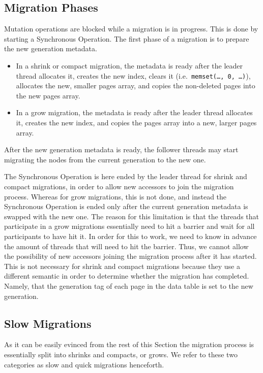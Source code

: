 \subsection{Migration Phases}\label{subsec:migration-phases}


Mutation operations are blocked while a migration is in progress.
This is done by starting a Synchronous Operation.
The first phase of a migration is to prepare the new generation metadata.
\begin{itemize}
	\item In a shrink or compact migration, the metadata is ready after the leader thread allocates it, creates the new index, clears it (i.e.\ \texttt{memset(\ldots, 0, \ldots)}), allocates the new, smaller pages array, and copies the non-deleted pages into the new pages array.
	\item In a grow migration, the metadata is ready after the leader thread allocates it, creates the new index, and copies the pages array into a new, larger pages array.
\end{itemize}
After the new generation metadata is ready, the follower threads may start migrating the nodes from the current generation to the new one.

The Synchronous Operation is here ended by the leader thread for shrink and compact migrations, in order to allow new accessors to join the migration process.
Whereas for grow migrations, this is not done, and instead the Synchronous Operation is ended only after the current generation metadata is swapped with the new one.
The reason for this limitation is that the threads that participate in a grow migrations essentially need to hit a barrier and wait for all participants to have hit it.
In order for this to work, we need to know in advance the amount of threads that will need to hit the barrier.
Thus, we cannot allow the possibility of new accessors joining the migration process after it has started.
This is not necessary for shrink and compact migrations because they use a different semantic in order to determine whether the migration has completed.
Namely, that the generation tag of each page in the data table is set to the new generation.


\subsection{Slow Migrations}\label{subsec:slow-migrations}

As it can be easily evinced from the rest of this Section the migration process is essentially split into shrinks and compacts, or grows.
We refer to these two categories as slow and quick migrations henceforth.

